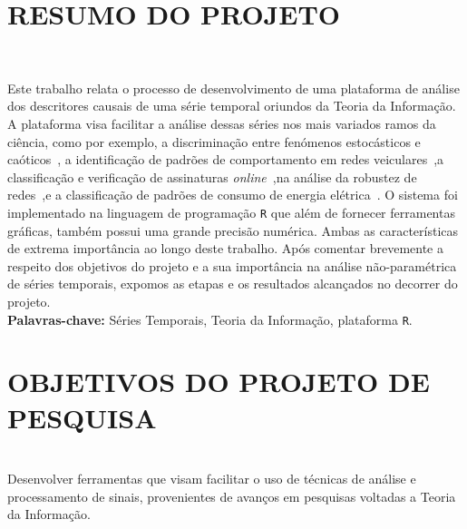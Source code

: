 \documentclass[12pt,letterpaper]{article}
\begin{document}
\hrulefill   


\newpage
\section*{\centering \textbf{RESUMO DO PROJETO}}
\hrulefill \\

\vspace{0.8cm}

 	Este trabalho relata o processo de desenvolvimento de uma plataforma de análise dos descritores causais de uma série temporal oriundos da Teoria da Informação.
	A plataforma visa facilitar a análise dessas séries nos mais variados ramos da ciência, como por exemplo, a discriminação entre fenómenos estocásticos e caóticos~\cite{DistinguishingNoiseFromChaos}, a identificação de padrões de comportamento em redes veiculares~\cite{CharacterizationVehicleBehaviorInformationTheory},a classificação e verificação de assinaturas \textit{online}~\cite{ClassificationVerificationOnlineHandwrittenSignatures},na análise da robustez de redes~\cite{InformationTheoryPerspectiveNetworkRobustness},e a classificação de padrões de consumo de energia elétrica~\cite{CharacterizationElectricLoadInformationTheoryQuantifiers}.
 	O sistema foi implementado na linguagem de programação \texttt R que além de fornecer ferramentas gráficas, também possui uma grande precisão numérica. 
 	Ambas as características de extrema importância ao longo deste trabalho.
 Após comentar brevemente a respeito dos objetivos do projeto e a sua importância na análise não-paramétrica de séries temporais, expomos as etapas e os resultados alcançados no decorrer do projeto.\\

\textbf{Palavras-chave:} Séries Temporais, Teoria da Informação, plataforma \texttt R.


\newpage
\section*{\centering \textbf{OBJETIVOS DO PROJETO DE PESQUISA}}
\hrulefill \\

Desenvolver ferramentas que visam facilitar o uso de técnicas de análise e processamento de sinais, provenientes de avanços em pesquisas voltadas a Teoria da Informação.
\end{document}
